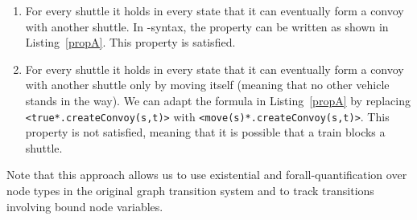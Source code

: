 
\begin{enumerate}[label=\emph{\alph*})]
  \item For every shuttle it holds in every state that it can eventually form a convoy with another shuttle.
	In \mcrl-syntax, the property can be written as shown in Listing~\ref{propA}.
	This property is satisfied.
  \item For every shuttle it holds in every state that it can eventually form a convoy with another shuttle 
  only by moving itself (meaning that no other vehicle stands in the way). We can adapt the formula in Listing~\ref{propA} by replacing \lstinline!<true*.createConvoy(s,t)>! with \lstinline!<move(s)*.createConvoy(s,t)>!.
  This property is not satisfied, meaning that it is possible that a train blocks a shuttle.
\end{enumerate}
Note that this approach allows us to use existential and forall-quantification over node types in the original graph transition system and to track transitions involving bound node variables.
